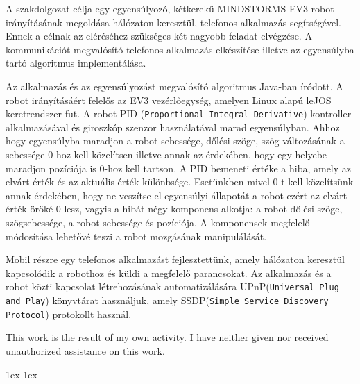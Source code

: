 \documentclass[final]{ubb_dolgozat}
\author{
Márton Zete-Örs
}
\begin{document}
\begin{abstractEN}
	
A szakdolgozat célja egy egyensúlyozó, kétkerekű MINDSTORMS EV3 robot irányításának megoldása hálózaton keresztül, telefonos alkalmazás segítségével. Ennek a célnak az eléréséhez szükséges két nagyobb feladat elvégzése. A kommunikációt megvalósító telefonos alkalmazás elkészítése illetve az egyensúlyba tartó algoritmus implementálása.

Az alkalmazás és az egyensúlyozást megvalósító algoritmus Java-ban íródott. A robot irányításáért felelős az EV3 vezérlőegység, amelyen Linux alapú leJOS keretrendszer fut. A robot PID (\texttt{Proportional Integral Derivative}) kontroller alkalmazásával és giroszkóp szenzor használatával marad egyensúlyban. Ahhoz hogy egyensúlyba maradjon a robot sebessége, dőlési szöge, szög változásának a sebessége 0-hoz kell közelítsen illetve annak az érdekében, hogy egy helyebe maradjon pozíciója is 0-hoz kell tartson.
A PID bemeneti értéke a hiba, amely az elvárt érték és az aktuális érték különbsége. Esetünkben mivel 0-t kell közelítsünk annak érdekében, hogy ne veszítse el egyensúlyi állapotát a robot ezért az elvárt érték öröké 0 lesz, vagyis a hibát négy komponens alkotja: a robot dőlési szöge, szögsebessége, a robot sebessége és pozíciója. A komponensek megfelelő módosítása lehetővé teszi a robot mozgásának manipulálását. 

Mobil részre egy telefonos alkalmazást fejlesztettünk, amely hálózaton keresztül kapcsolódik a robothoz és küldi a megfelelő parancsokat. Az alkalmazás és a robot közti kapcsolat létrehozásának automatizálására UPnP(\texttt{Universal Plug and Play}) könyvtárat használjuk, amely SSDP(\texttt{Simple Service Discovery Protocol}) protokollt használ.

This work is the result of my own activity. I have neither given nor received unauthorized assistance on this work.

\end{abstractEN}

\maketitle

{ \baselineskip 1ex
  \parskip 1ex
  \tableofcontents
}





%
%
%
\appendix

{ 
	\renewcommand{\baselinestretch}{1.1}\normalsize %
	\setlength{\itemsep}{-2.4mm}
	\setlength{\bibspacing}{0.67\baselineskip}
	
	
}
\end{document}
